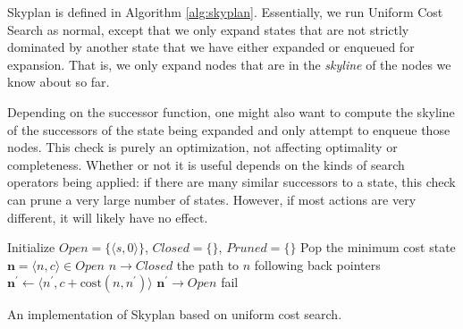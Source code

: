 \documentclass[letterpaper]{article}
\theoremstyle{plain} \newtheorem{theorem}{Theorem} \newtheorem{proposition}{Proposition} \newtheorem{lemma}{Lemma}
\theoremstyle{definition} \newtheorem{definition}{Definition} \newtheorem{conjecture}{Conjecture} \newtheorem*{example}{Example}
\theoremstyle{remark} \newtheorem*{remark}{Remark} \newtheorem*{note}{Note} \newtheorem{case}{Case}
\begin{document}
Skyplan is defined in Algorithm \ref{alg:skyplan}. Essentially, we
run Uniform Cost Search as normal, except that we only expand states
that are not strictly dominated by another state that we have either
expanded or enqueued for expansion. That is, we only expand nodes
that are in the \textit{skyline} of the nodes we know about so far.

Depending on the successor function, one might also want to compute
the skyline of the successors of the state being expanded and only
attempt to enqueue those nodes.  This check is purely an optimization,
not affecting optimality or completeness. Whether or not it is
useful depends on the kinds of search operators being applied: if
there are many similar successors to a state, this check can prune a very large
number of states. However, if most actions are very different, it will
likely have no effect.

\begin{algorithm}
  \begin{algorithmic}[1]
    \State Initialize $Open=\{\langle s,0\rangle\}$, $Closed=\{\}$, $Pruned=\{\}$
    \State Pop the minimum cost state $\mathbf{n} = \langle n,c\rangle\in Open$
      \State $n\rightarrow Closed$
        \State \Return the path to $n$ following back pointers
      \EndIf
        \State $\mathbf{n^\prime} \gets \langle n^\prime,c+\mathrm{cost}(n,n^\prime)\rangle$
          \State $\mathbf{n^\prime} \rightarrow Open$
        \EndFor
      \EndIf
    \EndWhile
    \State fail
  \EndProcedure
  \end{algorithmic}
\caption{An implementation of Skyplan based on uniform cost search.  }
\label{alg:skyplan}
\end{algorithm}
\end{document}
